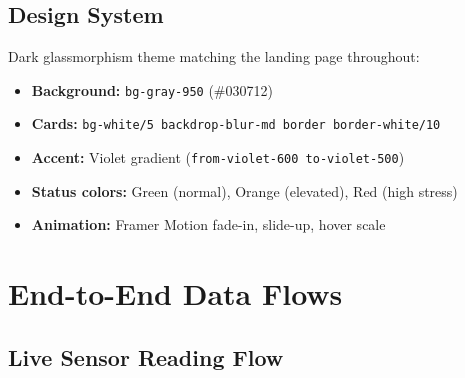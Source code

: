 \documentclass[12pt,a4paper]{report}
\begin{document}
\section{Design System}

Dark glassmorphism theme matching the landing page throughout:

\begin{itemize}[leftmargin=2em]
  \item \textbf{Background:} \texttt{bg-gray-950} (\#030712)
  \item \textbf{Cards:} \texttt{bg-white/5 backdrop-blur-md border border-white/10}
  \item \textbf{Accent:} Violet gradient (\texttt{from-violet-600 to-violet-500})
  \item \textbf{Status colors:} Green (normal), Orange (elevated), Red (high stress)
  \item \textbf{Animation:} Framer Motion fade-in, slide-up, hover scale
\end{itemize}

\chapter{End-to-End Data Flows}

\section{Live Sensor Reading Flow}
\end{document}
